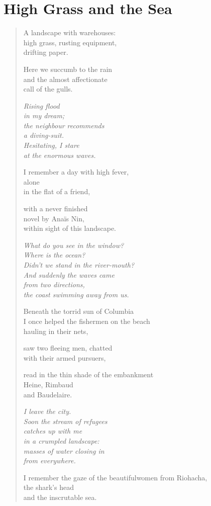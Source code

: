 \clearpage

\section{High Grass and the Sea}

\begin{verse}

A landscape with warehouses:\\
high grass, rusting equipment,\\
drifting paper.

Here we succumb to the rain\\
and the almost affectionate\\
call of the gulls.

{\itshape
Rising flood\\
in my dream;\\
the neighbour recommends\\
a diving-suit.\\
Hesitating, I stare\\
at the enormous waves.}

I remember a day with high fever,\\
alone\\
in the flat of a friend,

with a never finished\\
novel by Anaïs Nin,\\
within sight of this landscape.

{\itshape
What do you see in the window?\\
Where is the ocean?\\
Didn't we stand in the river-mouth?\\
And suddenly the waves came\\
from two directions,\\
the coast swimming away from us.}

Beneath the torrid sun of Columbia\\
I once helped the fishermen on the beach\\
hauling in their nets,

saw two fleeing men, chatted\\
with their armed pursuers,

read in the thin shade of the embankment\\
Heine, Rimbaud\\
and Baudelaire.

{\itshape
I leave the city.\\
Soon the stream of refugees\\
catches up with me\\
in a crumpled landscape:\\
masses of water closing in\\
from everywhere.}

I remember the gaze of the beautiful\verselinebreak women from Riohacha,\\
the shark's head\\
and the inscrutable sea.

\end{verse}

